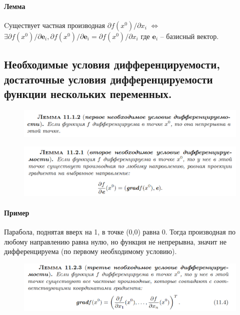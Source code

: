 \documentclass{article}
\begin{document}
\paragraph*{Лемма} Cуществует частная производная $\partial f(x^0)/\partial x_i$ $\Leftrightarrow$ $\exists \partial f(x^0)/\partial \mathbf{e}_i, \partial f(x^0)/\partial \mathbf{e}_i = \partial f(x^0)/\partial x_i$ где $\mathbf{e}_i$ -- базисный вектор.

\newpage
\subsection{Необходимые условия дифференцируемости, достаточные условия дифференцируемости функции нескольких переменных.}
\begin{figure}[h!]
    \centering
    \includegraphics[width=\textwidth]{36.png}
    \vspace{-1cm}
\end{figure}

\begin{figure}[h!]
    \centering
    \includegraphics[width=\textwidth]{37.png}
    \vspace{-1cm}
\end{figure}
\paragraph*{Пример} Парабола, поднятая вверх на 1, в точке (0,0) равна 0. Тогда производная по любому направлению равна нулю, но функция не непрерывна, значит не дифференцируема (по первому необходимому условию).

\begin{figure}[h!]
    \centering
    \includegraphics[width=\textwidth]{38.png}
    \vspace{-1cm}
\end{figure}
\end{document}
